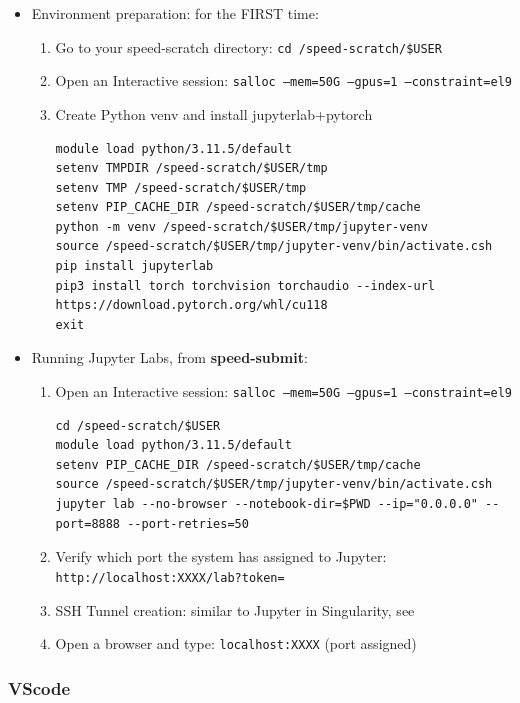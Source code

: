 \begin{itemize}
\item
Environment preparation: for the FIRST time:
\begin{enumerate}
\item
Go to your speed-scratch directory: \texttt{cd /speed-scratch/\$USER}
\item
Open an Interactive session: \texttt{salloc --mem=50G --gpus=1 --constraint=el9}
\item
Create Python venv and install jupyterlab+pytorch
\scriptsize
\begin{verbatim}
module load python/3.11.5/default
setenv TMPDIR /speed-scratch/$USER/tmp
setenv TMP /speed-scratch/$USER/tmp
setenv PIP_CACHE_DIR /speed-scratch/$USER/tmp/cache
python -m venv /speed-scratch/$USER/tmp/jupyter-venv
source /speed-scratch/$USER/tmp/jupyter-venv/bin/activate.csh
pip install jupyterlab
pip3 install torch torchvision torchaudio --index-url https://download.pytorch.org/whl/cu118
exit
\end{verbatim}
\normalsize
\end{enumerate}
\item
Running Jupyter Labs, from \textbf{speed-submit}:
\begin{enumerate}
\item
Open an Interactive session: \texttt{salloc --mem=50G --gpus=1 --constraint=el9} 
\scriptsize
\begin{verbatim}
cd /speed-scratch/$USER
module load python/3.11.5/default
setenv PIP_CACHE_DIR /speed-scratch/$USER/tmp/cache
source /speed-scratch/$USER/tmp/jupyter-venv/bin/activate.csh
jupyter lab --no-browser --notebook-dir=$PWD --ip="0.0.0.0" --port=8888 --port-retries=50
\end{verbatim}
\normalsize
\item
Verify which port the system has assigned to Jupyter: 
\texttt{http://localhost:XXXX/lab?token=}
\item
SSH Tunnel creation: similar to Jupyter in Singularity, see 
\item
Open a browser and type: \texttt {localhost:XXXX} (port assigned)
\end{enumerate}
\end{itemize}


\subsubsection{VScode}
\label{sect:vscode}

